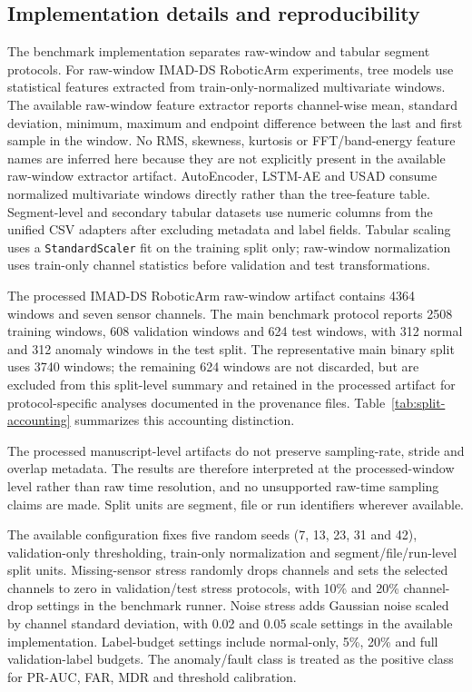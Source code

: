 \subsection{Implementation details and reproducibility}

The benchmark implementation separates raw-window and tabular segment protocols. For raw-window IMAD-DS RoboticArm experiments, tree models use statistical features extracted from train-only-normalized multivariate windows. The available raw-window feature extractor reports channel-wise mean, standard deviation, minimum, maximum and endpoint difference between the last and first sample in the window. No RMS, skewness, kurtosis or FFT/band-energy feature names are inferred here because they are not explicitly present in the available raw-window extractor artifact. AutoEncoder, LSTM-\allowbreak AE and USAD consume normalized multivariate windows directly rather than the tree-feature table. Segment-level and secondary tabular datasets use numeric columns from the unified CSV adapters after excluding metadata and label fields. Tabular scaling uses a \texttt{StandardScaler} fit on the training split only; raw-window normalization uses train-only channel statistics before validation and test transformations.

The processed IMAD-DS RoboticArm raw-window artifact contains 4364 windows and seven sensor channels. The main benchmark protocol reports 2508 training windows, 608 validation windows and 624 test windows, with 312 normal and 312 anomaly windows in the test split. The representative main binary split uses 3740 windows; the remaining 624 windows are not discarded, but are excluded from this split-level summary and retained in the processed artifact for protocol-specific analyses documented in the provenance files. Table~\ref{tab:split-accounting} summarizes this accounting distinction.



The processed manuscript-level artifacts do not preserve sampling-rate, stride and overlap metadata. The results are therefore interpreted at the processed-window level rather than raw time resolution, and no unsupported raw-time sampling claims are made. Split units are segment, file or run identifiers wherever available.

The available configuration fixes five random seeds (7, 13, 23, 31 and 42), validation-only thresholding, train-only normalization and segment/file/run-level split units. Missing-sensor stress randomly drops channels and sets the selected channels to zero in validation/test stress protocols, with 10\% and 20\% channel-drop settings in the benchmark runner. Noise stress adds Gaussian noise scaled by channel standard deviation, with 0.02 and 0.05 scale settings in the available implementation. Label-budget settings include normal-only, 5\%, 20\% and full validation-label budgets. The anomaly/fault class is treated as the positive class for PR-AUC, FAR, MDR and threshold calibration.

